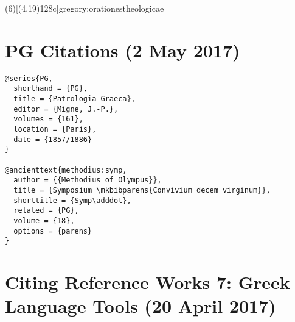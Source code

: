 \documentclass[a4paper]{article}
\begin{document}
\examplecite(6)[(4.19)128c]{gregory:orationestheologicae}
\exampleabbreviations
{}

\section{PG Citations (2 May 2017)}

\begin{verbatim}
@series{PG,
  shorthand = {PG},
  title = {Patrologia Graeca},
  editor = {Migne, J.-P.},
  volumes = {161},
  location = {Paris},
  date = {1857/1886}
}

@ancienttext{methodius:symp,
  author = {{Methodius of Olympus}},
  title = {Symposium \mkbibparens{Convivium decem virginum}},
  shorttitle = {Symp\adddot},
  related = {PG},
  volume = {18},
  options = {parens}
}
\end{verbatim}

\exampleancientsources
\examplesecondarysources
{}

\section{Citing Reference Works 7: Greek Language Tools (20 April 2017)}
\end{document}
